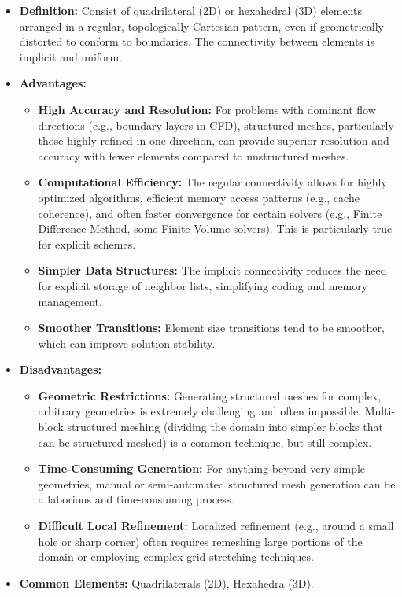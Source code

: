 \documentclass{book}
\begin{document}
\begin{itemize}[leftmargin=*,label=\textbullet]
    \item \textbf{Definition:} Consist of quadrilateral (2D) or hexahedral (3D) elements arranged in a regular, topologically Cartesian pattern, even if geometrically distorted to conform to boundaries. The connectivity between elements is implicit and uniform.
    \item \textbf{Advantages:}
    \begin{itemize}[leftmargin=*,label=$\circ$]
        \item \textbf{High Accuracy and Resolution:} For problems with dominant flow directions (e.g., boundary layers in CFD), structured meshes, particularly those highly refined in one direction, can provide superior resolution and accuracy with fewer elements compared to unstructured meshes.
        \item \textbf{Computational Efficiency:} The regular connectivity allows for highly optimized algorithms, efficient memory access patterns (e.g., cache coherence), and often faster convergence for certain solvers (e.g., Finite Difference Method, some Finite Volume solvers). This is particularly true for explicit schemes.
        \item \textbf{Simpler Data Structures:} The implicit connectivity reduces the need for explicit storage of neighbor lists, simplifying coding and memory management.
        \item \textbf{Smoother Transitions:} Element size transitions tend to be smoother, which can improve solution stability.
    \end{itemize}
    \item \textbf{Disadvantages:}
    \begin{itemize}[leftmargin=*,label=$\circ$]
        \item \textbf{Geometric Restrictions:} Generating structured meshes for complex, arbitrary geometries is extremely challenging and often impossible. Multi-block structured meshing (dividing the domain into simpler blocks that can be structured meshed) is a common technique, but still complex.
        \item \textbf{Time-Consuming Generation:} For anything beyond very simple geometries, manual or semi-automated structured mesh generation can be a laborious and time-consuming process.
        \item \textbf{Difficult Local Refinement:} Localized refinement (e.g., around a small hole or sharp corner) often requires remeshing large portions of the domain or employing complex grid stretching techniques.
    \end{itemize}
    \item \textbf{Common Elements:} Quadrilaterals (2D), Hexahedra (3D).
\end{itemize}
\end{document}
